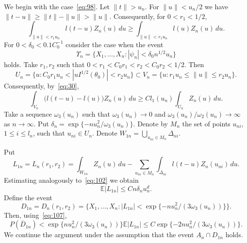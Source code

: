 \documentclass[11pt,a4paper]{article}
\begin{document}
We begin with the case~\eqref{eq:98}. Let $\|t\|>u_n$. For $\|u\|<u_n/2$ we have $\|t-u\|\ge\|t\|-\|u\|>\|u\|$. Consequently, for $0<r_1<1/2$,
\begin{equation}
\int_{\|u\|<r_1u_n}l(t-u)Z_n(u)\,du\ge\int_{\|u\|<r_1u_n}l(u)Z_n(u)\,du.
\label{eq:103}
\end{equation}
For $0<\delta_0<0.1C_0^{-1}$ consider the case when the event
\begin{equation}
\Upsilon_n=\{X_1,\dots,X_n:|\psi_n|<\delta_0 n^{1/2}u_n\}
\label{eq:104}
\end{equation}
holds. Take $r_1,r_2$ such that $0<r_1<C_0r_1<r_2<C_0r_2<1/2$. Then
\[
U_n=\{u:C_0r_1u_n<|uI^{1/2}(\theta_0)|<r_2u_n\}\subset V_n=\{u:r_1u_n\le\|u\|\le r_2u_n\}.
\]
Consequently, by~\eqref{eq:30},
\begin{equation}
\int_{V_n}\bigl(l(t-u)-l(u)\bigr)Z_n(u)\,du\ge C l_1(u_n)\int_{U_n}Z_n(u)\,du.
\label{eq:105}
\end{equation}
Take a sequence $\omega_3(u_n)$ such that $\omega_3(u_n)\to0$ and $\omega_3(u_n)/\omega_2(u_n)\to\infty$ as $n\to\infty$. Put $\delta_n=\exp\{-nu_n^2/\omega_3(u_n)\}$. Denote by $M_n$ the set of points $u_{ni}$, $1\le i\le l_n$, such that $u_{ni}\in U_n$. Denote $W_{1n}=\bigcup_{u_{ni}\in M_n}\Delta_{ni}$.

Put
\begin{equation}
L_{1n}=L_n(r_1,r_2)=\int_{W_{1n}}Z_n(u)\,du-\sum_{u_{ni}\in M_n}\int_{\Delta_{ni}}l(t-u)Z_n(u_{ni})\,du.
\label{eq:106}
\end{equation}
Estimating analogously to~\eqref{eq:102} we obtain
\begin{equation}
\mathbb{E}|L_{1n}|\le Cn\delta_nu_n^d.
\label{eq:107}
\end{equation}
Define the event
\[
D_{1n}=D_n(r_1,r_2)=\bigl\{X_1,\dots,X_n:|L_{1n}|<\exp\{-nu_n^2/(3\omega_3(u_n))\}\bigr\}.
\]
Then, using~\eqref{eq:107},
\begin{equation}
P(\overline{D}_{1n})<\exp\{nu_n^2/(3\omega_3(u_n))\}\mathbb{E}|L_{1n}|\le C\exp\{-2nu_n^2/(3\omega_3(u_n))\}.
\label{eq:108}
\end{equation}
We continue the argument under the assumption that the event $A_n\cap D_{1n}$ holds.
\end{document}
